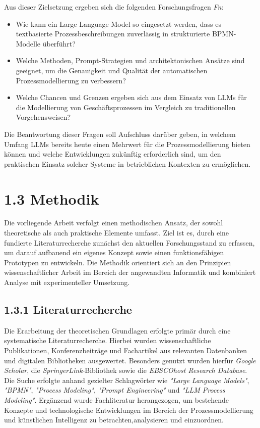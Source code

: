 \documentclass[a4paper,12pt]{scrreprt}
\begin{document}
\newpage

Aus dieser Zielsetzung ergeben sich die folgenden Forschungsfragen \textit{Fn}:

\begin{itemize}
    \item[\textit{F1}\textbf{:}] Wie kann ein Large Language Model so eingesetzt werden, dass es textbasierte Prozessbeschreibungen zuverlässig in strukturierte BPMN-Modelle überführt?
    \item[\textit{F2}\textbf{:}] Welche Methoden, Prompt-Strategien und architektonischen Ansätze sind geeignet, um die Genauigkeit und Qualität der automatischen Prozessmodellierung zu verbessern?
    \item[\textit{F3}\textbf{:}] Welche Chancen und Grenzen ergeben sich aus dem Einsatz von LLMs für die Modellierung von Geschäftsprozessen im Vergleich zu traditionellen Vorgehensweisen?
\end{itemize}

Die Beantwortung dieser Fragen soll Aufschluss darüber geben, in welchem Umfang LLMs bereits heute einen Mehrwert für die Prozessmodellierung bieten können und welche Entwicklungen zukünftig erforderlich sind, um den praktischen Einsatz solcher Systeme in betrieblichen Kontexten zu ermöglichen.

\section*{1.3 Methodik}

Die vorliegende Arbeit verfolgt einen methodischen Ansatz, der sowohl theoretische als auch praktische Elemente umfasst. Ziel ist es, durch eine fundierte Literaturrecherche zunächst den aktuellen Forschungsstand zu erfassen, um darauf aufbauend ein eigenes Konzept sowie einen funktionsfähigen Prototypen zu entwickeln. Die Methodik orientiert sich an den Prinzipien wissenschaftlicher Arbeit im Bereich der angewandten Informatik und kombiniert Analyse mit experimenteller Umsetzung.

\subsection*{1.3.1 Literaturrecherche}
Die Erarbeitung der theoretischen Grundlagen erfolgte primär durch eine systematische Literaturrecherche. Hierbei wurden wissenschaftliche Publikationen, Konferenzbeiträge und Fachartikel aus relevanten Datenbanken und digitalen Bibliotheken ausgewertet. Besonders genutzt wurden hierfür \textit{Google Scholar}, die \textit{SpringerLink}-Bibliothek sowie die \textit{EBSCOhost Research Database}. Die Suche erfolgte anhand gezielter Schlagwörter wie \textit{"Large Language Models"}, \textit{"BPMN"}, \textit{"Process Modeling"}, \textit{"Prompt Engineering"} und \textit{"LLM Process Modeling"}. Ergänzend wurde Fachliteratur herangezogen, um bestehende Konzepte und technologische Entwicklungen im Bereich der Prozessmodellierung und künstlichen Intelligenz zu betrachten,analysieren und einzuordnen.
\end{document}
